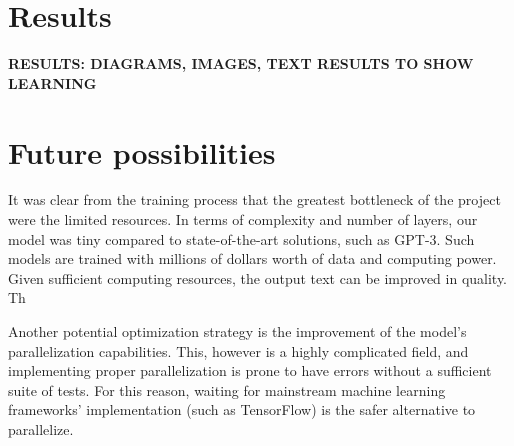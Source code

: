 \documentclass[journal]{IEEEtai}
\begin{document}
\section{Results}
\textbf{RESULTS: DIAGRAMS, IMAGES, TEXT RESULTS TO SHOW LEARNING}

\section{Future possibilities}
It was clear from the training process that the greatest bottleneck of the project were the limited resources. In terms of complexity and number of layers, our model was tiny compared to state-of-the-art solutions, such as GPT-3. Such models are trained with millions of dollars worth of data and computing power. Given sufficient computing resources, the output text can be improved in quality. Th

Another potential optimization strategy is the improvement of the model's parallelization capabilities. This, however is a highly complicated field, and implementing proper parallelization is prone to have errors without a sufficient suite of tests. For this reason, waiting for mainstream machine learning frameworks' implementation (such as TensorFlow\cite{tf}) is the safer alternative to parallelize.




\end{document}

